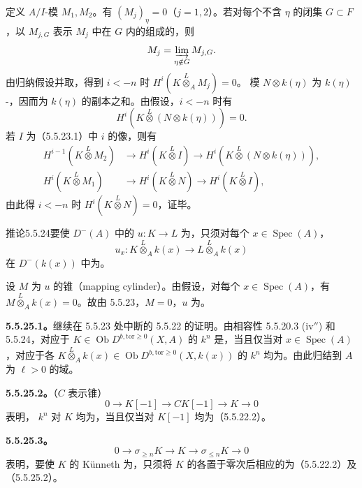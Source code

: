 定义 $A/I$-模 $M_1,M_2$。有 $(M_j)_\eta=0$（$j=1,2$）。若对每个不含 $\eta$ 的闭集 $G\subset F$，以 $M_{j,G}$ 表示 $M_j$ 中在 $G$ 内的组成的，则
\[M_j=\varinjlim_{\eta\notin G}M_{j,G}.\]
由归纳假设并取，得到 $i<-n$ 时 $H^i(K\overset L\otimes_A M_j)=0$。
模 $N\otimes k(\eta)$ 为 $k(\eta)$-，因而为 $k(\eta)$ 的副本之和。由假设，$i<-n$ 时有
\[H^i(K\overset L\otimes(N\otimes k(\eta)))=0.\]
若 $I$ 为（5.5.23.1）中 $i$ 的像，则有
\[\begin{aligned}
H^{i-1}(K\overset L\otimes M_2)&\longrightarrow H^i(K\overset L\otimes I)\longrightarrow H^i(K\overset L\otimes(N\otimes k(\eta))),\\
H^i(K\overset L\otimes M_1)&\longrightarrow H^i(K\overset L\otimes N)\longrightarrow H^i(K\overset L\otimes I),
\end{aligned}\]
由此得 $i<-n$ 时 $H^i(K\overset L\otimes N)=0$，证毕。
\begin{SGAresult}{推论}{5.5.24}要使 $D^-(A)$ 中的 $u:K\to L$ 为，只须对每个 $x\in\operatorname{Spec}(A)$，
\[u_x:K\overset L\otimes_A k(x)\longrightarrow L\overset L\otimes_A k(x)\]
在 $D^-(k(x))$ 中为。
\end{SGAresult}
设 $M$ 为 $u$ 的锥（mapping cylinder）。由假设，对每个 $x\in\operatorname{Spec}(A)$，有 $M\overset L\otimes_A k(x)=0$。故由 5.5.23，$M=0$，$u$ 为。

\textbf{5.5.25.1。}继续在 5.5.23 处中断的 5.5.22 的证明。由相容性 5.5.20.3 (iv$''$) 和 5.5.24，对应于 $K\in\operatorname{Ob}D^{b,\mathrm{tor}\geq0}(X,A)$ 的 $k^n$ 是，当且仅当对 $x\in\operatorname{Spec}(A)$，对应于各 $K\overset L\otimes_A k(x)\in\operatorname{Ob}D^{b,\mathrm{tor}\geq0}(X,k(x))$ 的 $k^n$ 均为。由此归结到 $A$ 为 $\ell>0$ 的域。

\textbf{5.5.25.2。}（$C$ 表示锥）
\[0\longrightarrow K[-1]\longrightarrow CK[-1]\longrightarrow K\longrightarrow0\]
表明， $k^n$ 对 $K$ 均为，当且仅当对 $K[-1]$ 均为（5.5.22.2）。

\textbf{5.5.25.3。}
\[0\longrightarrow\sigma_{\geq n}K\longrightarrow K\longrightarrow\sigma_{\leq n}K\longrightarrow0\]
表明，要使 $K$ 的 Künneth 为，只须将 $K$ 的各置于零次后相应的为（5.5.22.2）及（5.5.25.2）。

